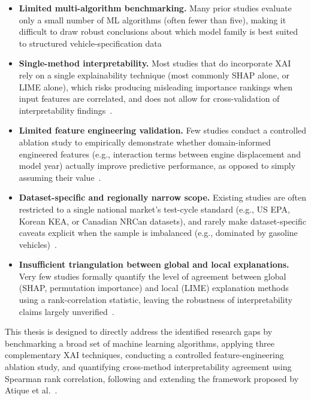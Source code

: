 \begin{itemize}
    \item \textbf{Limited multi-algorithm benchmarking.} Many prior studies evaluate only a small number of ML algorithms (often fewer than five), making it difficult to draw robust conclusions about which model family is best suited to structured vehicle-specification data~\cite{atique2026explainable}\cite{alhakamy2023used}

    \item \textbf{Single-method interpretability.} Most studies that do incorporate XAI rely on a single explainability technique (most commonly SHAP alone, or LIME alone), which risks producing misleading importance rankings when input features are correlated, and does not allow for cross-validation of interpretability findings~\cite{farooq2025interpretable}\cite{ghadi2025explainable}\cite{mangalathu2020failure}\cite{haque2025ensemblexai}.

    \item \textbf{Limited feature engineering validation.} Few studies conduct a controlled ablation study to empirically demonstrate whether domain-informed engineered features (e.g., interaction terms between engine displacement and model year) actually improve predictive performance, as opposed to simply assuming their value~\cite{atique2026explainable}.

    \item \textbf{Dataset-specific and regionally narrow scope.} Existing studies are often restricted to a single national market's test-cycle standard (e.g., US EPA, Korean KEA, or Canadian NRCan datasets), and rarely make dataset-specific caveats explicit when the sample is imbalanced (e.g., dominated by gasoline vehicles)~\cite{atique2026explainable}\cite{yoo2025machine}\cite{hamed2021fuel}.

    \item \textbf{Insufficient triangulation between global and local explanations.} Very few studies formally quantify the level of agreement between global (SHAP, permutation importance) and local (LIME) explanation methods using a rank-correlation statistic, leaving the robustness of interpretability claims largely unverified~\cite{atique2026explainable}.
\end{itemize}

This thesis is designed to directly address the identified research gaps by benchmarking a broad set of machine learning algorithms, applying three complementary XAI techniques, conducting a controlled feature-engineering ablation study, and quantifying cross-method interpretability agreement using Spearman rank correlation, following and extending the framework proposed by Atique et al.~\cite{atique2026explainable}.

